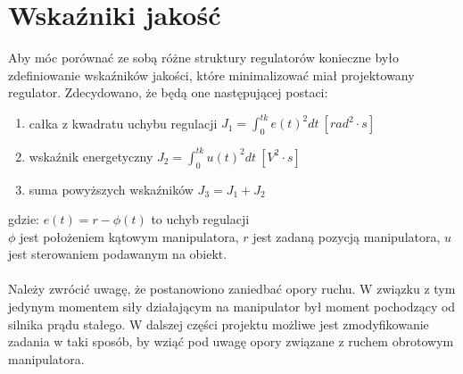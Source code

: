 \section{Wska\'zniki jakość}
Aby móc porównać ze sobą różne struktury regulatorów  konieczne było zdefiniowanie wska\'zników jakości, które minimalizować miał projektowany regulator. Zdecydowano, że będą one następującej postaci:
\begin{enumerate}
	\item całka z kwadratu uchybu regulacji $J_1 = \int_{0}^{tk}e(t)^2 dt \  [rad^2 \cdot s]$
	\item  wska\'znik energetyczny $J_2 = \int_{0}^{tk}u(t)^2 dt \ [V^2 \cdot s]$
	\item  suma powyższych wska\'zników $J_3 = J_1 + J _2$
\end{enumerate}
\begin{equation}
\end{equation}
\noindent gdzie:\newline
$e(t) = r - \phi(t)$ to uchyb regulacji\\
\(\phi\) jest położeniem kątowym manipulatora,\newline
\(r\) jest zadaną pozycją manipulatora,\newline
\(u\) jest sterowaniem podawanym na obiekt.

\paragraph*{}
Należy zwrócić uwagę, że postanowiono zaniedbać opory ruchu. W związku z tym jedynym momentem siły działającym na manipulator był moment pochodzący od silnika prądu stałego. W dalszej części projektu możliwe jest zmodyfikowanie zadania w taki sposób, by wziąć pod uwagę opory związane z ruchem obrotowym manipulatora.